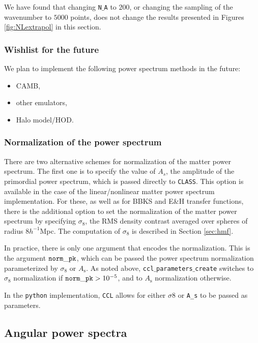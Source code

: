 \documentclass[\docopts]{\docclass}
\begin{document}
We have found that changing {\tt N$\_$A} to $200$, or changing the sampling of the wavenumber to $5000$ points, does not change the results presented in Figures \ref{fig:NLextrapol} in this section.

\subsubsection{Wishlist for the future}
\label{Pk_wishlist}
We plan to implement the following power spectrum methods in the future:
\begin{itemize}
 \item CAMB,
 \item other emulators,
 \item Halo model/HOD.
\end{itemize}


\subsubsection{Normalization of the power spectrum}
\label{sec:PSnorm}

There are two alternative schemes for normalization of the matter power spectrum. The first one is to specify the value of $A_s$, the amplitude of the primordial power spectrum, which is passed directly to {\tt CLASS}. This option is available in the case of the linear/nonlinear matter power spectrum implementation. For these, as well as for BBKS and E\&H transfer functions, there is the additional option to set the normalization of the matter power spectrum by specifying $\sigma_8$, the RMS density contrast averaged over spheres of radius $8h^{-1}$Mpc. The computation of $\sigma_8$ is described in Section \ref{sec:hmf}.

In practice, there is only one argument that encodes the normalization. This is the argument ${\tt norm\_pk}$, which can be passed the power spectrum normalization parameterized by $\sigma_8$ or $A_\mathrm{s}$. As noted above, {\tt ccl$\_$parameters$\_$create} switches to $\sigma_8$ normalization if ${\tt norm\_pk} > 10^{-5}$, and to $A_{\mathrm s}$ normalization otherwise.

In the {\tt python} implementation, {\tt CCL} allows for either $\sigma 8$ or {\tt A\_s} to be passed as parameters.

\subsection{Angular power spectra}
\label{sec:cl}
\end{document}
